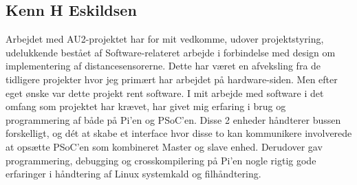 \subsection{Kenn H Eskildsen}\label{sec:opnaaede_erfaringer_ke}

Arbejdet med AU2-projektet har for mit vedkomme, udover projektstyring, udelukkende bestået af Software-relateret arbejde i forbindelse med design om implementering af distancesensorerne. 
Dette har været en afveksling fra de tidligere projekter hvor jeg primært har arbejdet på hardware-siden. 
Men efter eget ønske var dette projekt rent software.
I mit arbejde med software i det omfang som projektet har krævet, har givet mig erfaring i brug og programmering af \IIC både på Pi'en og PSoC'en. 
Disse 2 enheder håndterer bussen forskelligt, og dét at skabe et interface hvor disse to kan kommunikere involverede at opsætte PSoC'en som kombineret Master og slave enhed. Derudover gav programmering, debugging og crosskompilering på Pi'en nogle rigtig gode erfaringer i håndtering af Linux systemkald og filhåndtering.